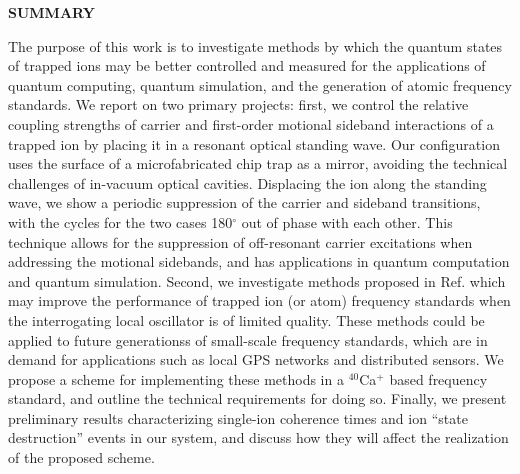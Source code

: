 \clearpage
\begin{centering}
\textbf{SUMMARY}\\
\vspace{\baselineskip}
\end{centering}




The purpose of this work is to investigate methods by which the quantum states of trapped ions may be better controlled and measured for the applications of quantum computing, quantum simulation, and the generation of atomic frequency standards. We report on two primary projects: first, we control the relative coupling strengths of carrier and first-order motional sideband interactions of a trapped ion by placing it in a resonant optical standing wave. Our configuration uses the surface of a microfabricated chip trap as a mirror, avoiding the technical challenges of in-vacuum optical cavities. Displacing the ion along the standing wave, we show a periodic suppression of the carrier and sideband transitions, with the cycles for the two cases 180$^{\circ}$ out of phase with each other. This technique allows for the suppression of off-resonant carrier excitations when addressing the motional sidebands, and has applications in quantum computation and quantum simulation. Second, we investigate methods proposed in Ref. \cite{BorregaardSorensen} which may improve the performance of trapped ion (or atom) frequency standards when the interrogating local oscillator is of limited quality. These methods could be applied to future generationss of small-scale frequency standards, which are in demand for applications such as local GPS networks and distributed sensors. We propose a scheme for  implementing these methods in a $^{40}$Ca$^+$ based frequency standard, and outline the technical requirements for doing so. Finally, we present preliminary results characterizing single-ion coherence times and ion ``state destruction'' events in our system, and discuss how they will affect the realization of the proposed scheme. 